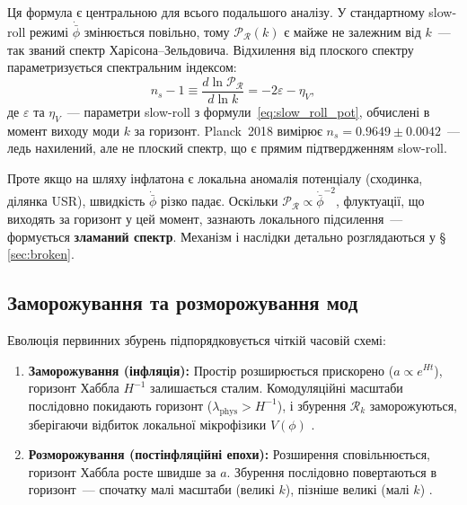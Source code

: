 \documentclass[12pt, a4paper]{article}
\begin{document}
Ця формула є центральною для всього подальшого аналізу. У
стандартному slow-roll режимі $\dot{\bar\phi}$ змінюється
повільно, тому $\mathcal{P}_{\mathcal{R}}(k)$ є майже не
залежним від $k$~--- так званий спектр Харісона--Зельдовича.
Відхилення від плоского спектру параметризується спектральним
індексом:
\begin{equation}\label{eq:ns}
  n_s - 1 \equiv \frac{d\ln\mathcal{P}_{\mathcal{R}}}{d\ln k}
            = -2\varepsilon - \eta_V,
\end{equation}
де $\varepsilon$ та $\eta_V$~--- параметри slow-roll з
формули~\eqref{eq:slow_roll_pot}, обчислені в момент виходу
моди $k$ за горизонт. Planck~2018 вимірює
$n_s = 0.9649 \pm 0.0042$~--- ледь нахилений, але не плоский
спектр, що є прямим підтвердженням slow-roll.

Проте якщо на шляху інфлатона є локальна аномалія потенціалу
(сходинка, ділянка USR), швидкість $\dot{\bar\phi}$ різко падає.
Оскільки $\mathcal{P}_{\mathcal{R}} \propto \dot{\bar\phi}^{-2}$,
флуктуації, що виходять за горизонт у цей момент, зазнають
локального підсилення~--- формується \textbf{зламаний спектр}.
Механізм і наслідки детально розглядаються у
§\,\ref{sec:broken}.

\subsection{Заморожування та розморожування мод}

Еволюція первинних збурень підпорядковується чіткій часовій
схемі:
\begin{enumerate}
  \item \textbf{Заморожування (інфляція):} Простір розширюється
        прискорено ($a \propto e^{Ht}$), горизонт Хаббла
        $H^{-1}$ залишається сталим. Комодуляційні масштаби
        послідовно покидають горизонт ($\lambda_\mathrm{phys} >
        H^{-1}$), і збурення $\mathcal{R}_k$ заморожуються,
        зберігаючи відбиток локальної мікрофізики $V(\phi)$
        \cite{bardeen_1980}.
  \item \textbf{Розморожування (постінфляційні епохи):}
        Розширення сповільнюється, горизонт Хаббла росте
        швидше за $a$. Збурення послідовно повертаються в
        горизонт~--- спочатку малі масштаби (великі $k$),
        пізніше великі (малі $k$) \cite{mukhanov_2005}.
\end{enumerate}
\end{document}
